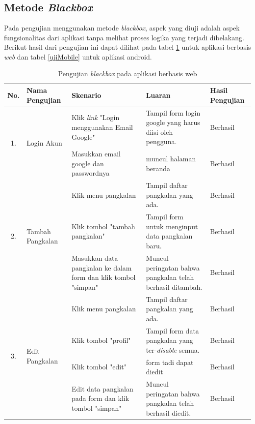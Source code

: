 	
	\subsection{Metode \textit{Blackbox}}
	
	Pada pengujian menggunakan metode \textit{blackbox}, aspek yang diuji adalah aspek fungsionalitas dari aplikasi tanpa melihat proses logika yang terjadi dibelakang. Berikut hasil dari pengujian ini dapat dilihat pada tabel \ref{ujiWeb} untuk aplikasi berbasis \textit{web} dan tabel \ref{ujiMobile} untuk aplikasi android.
	
	\begin{longtable}{ |c|p{3cm}|p{3cm}|p{3cm}|p{2cm}|}
	\caption{Pengujian \textit{blackbox} pada aplikasi berbasis web}
	\label{ujiWeb} \\ \hline
	\textbf{No.}                  &  \textbf{Nama Pengujian}         & \textbf{Skenario}                                       & \textbf{Luaran}              & \textbf{Hasil Pengujian} \\ \hline
	
	
	\multirow{2}{*}{1.}  & 	\multirow{2}{*}{Login Akun} & Klik \textit{link} "Login menggunakan Email Google"           & Tampil form login google yang harus diisi oleh pengguna.             & Berhasil \\ \cline{3-5}
	& & Masukkan email google dan passwordnya           & muncul halaman beranda         & Berhasil \\ \hline
	
	\multirow{3}{*}{2.}  & 	\multirow{3}{*}{Tambah Pangkalan} & Klik menu pangkalan           & Tampil daftar pangkalan yang ada.             & Berhasil \\ \cline{3-5}
	& & Klik tombol "tambah pangkalan"           & Tampil form untuk menginput data pangkalan baru.             & Berhasil \\ \hline
	& & Masukkan data pangkalan ke dalam form dan klik tombol "simpan"           & Muncul peringatan bahwa pangkalan telah berhasil ditambah.             & Berhasil \\ \hline
	
	\multirow{4}{*}{3.}  & 	\multirow{4}{*}{Edit Pangkalan} & Klik menu pangkalan           & Tampil daftar pangkalan yang ada.             & Berhasil \\ \cline{3-5}
	& & Klik tombol "profil"           & Tampil form data pangkalan yang ter-\textit{disable} semua.             & Berhasil \\ \cline{3-5}
	& & Klik tombol "edit"           & form tadi dapat diedit             & Berhasil \\ \cline{3-5}
	& & Edit data pangkalan pada form dan klik tombol "simpan"           & Muncul peringatan bahwa pangkalan telah berhasil diedit.             & Berhasil \\ \hline
	

\end{longtable}
